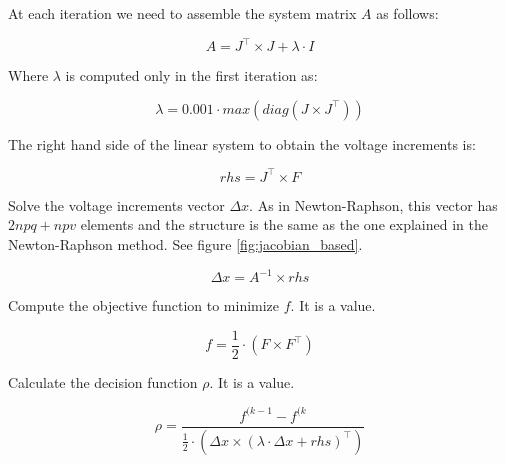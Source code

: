 \documentclass[a4paper,twoside]{tufte-book}
\begin{document}
At each iteration we need to assemble the system matrix $A$ as follows:
%
%
%


\begin{equation}
A = J^\top \times J + \lambda \cdot I
\label{eq:lm_A}
\end{equation}

Where $\lambda$ is computed only in the first iteration as:

\begin{equation}
\lambda = 0.001 \cdot max(diag(J \times J^\top))
\end{equation}

The right hand side of the linear system to obtain the voltage increments is:


\begin{equation}
rhs = J^\top \times F
\label{eq:lm_rhs}
\end{equation}


Solve the voltage increments vector $\Delta x$. As in Newton-Raphson, this vector has $2npq+npv$ elements and the structure is the same as the one explained in the Newton-Raphson method. See figure \ref{fig:jacobian_based}.

\begin{equation}
\Delta x = A^{-1} \times rhs
\label{eq:lm_solve}
\end{equation}

Compute the objective function to minimize $f$. It is a value.

\begin{equation}
f = \frac{1}{2} \cdot (F \times F^\top)
\label{eq:lm_f}
\end{equation}

Calculate the decision function $\rho$. It is a value.


\begin{equation}
\rho = \frac{f^{(k-1}-f^{(k}}{\frac{1}{2} \cdot (\Delta x \times (\lambda \cdot \Delta x + rhs)^\top)}
\label{eq:lm_rho}
\end{equation}
\end{document}
